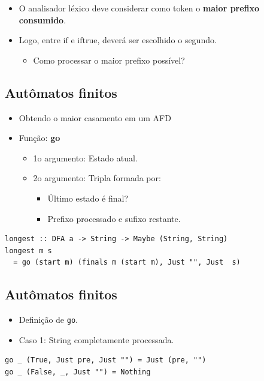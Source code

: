 \documentclass[11pt]{article}
\begin{document}
\begin{itemize}
\item O analisador léxico deve considerar como token o \textbf{maior prefixo consumido}.

\item Logo, entre \(\mathrm{if}\) e \(\mathrm{iftrue}\), deverá ser escolhido o segundo.
\begin{itemize}
\item Como processar o maior prefixo possível?
\end{itemize}
\end{itemize}
\subsection*{Autômatos finitos}
\label{sec:org7cd0f34}

\begin{itemize}
\item Obtendo o maior casamento em um AFD

\item Função: \textbf{go}
\begin{itemize}
\item 1o argumento: Estado atual.
\item 2o argumento: Tripla formada por:
\begin{itemize}
\item Último estado é final?
\item Prefixo processado e sufixo restante.
\end{itemize}
\end{itemize}
\end{itemize}

\begin{verbatim}
longest :: DFA a -> String -> Maybe (String, String)
longest m s
  = go (start m) (finals m (start m), Just "", Just  s)
\end{verbatim}
\subsection*{Autômatos finitos}
\label{sec:orgaeefdb5}

\begin{itemize}
\item Definição de \texttt{go}.

\item Caso 1: String completamente processada.
\end{itemize}

\begin{verbatim}
go _ (True, Just pre, Just "") = Just (pre, "")
go _ (False, _, Just "") = Nothing
\end{verbatim}
\end{document}
